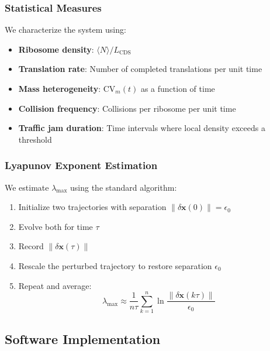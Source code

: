 \documentclass[11pt]{article}
\begin{document}
\subsubsection{Statistical Measures}

We characterize the system using:
\begin{itemize}[nosep]
    \item \textbf{Ribosome density}: $\langle N \rangle / L_{\text{CDS}}$
    \item \textbf{Translation rate}: Number of completed translations per unit time
    \item \textbf{Mass heterogeneity}: $\text{CV}_m(t)$ as a function of time
    \item \textbf{Collision frequency}: Collisions per ribosome per unit time
    \item \textbf{Traffic jam duration}: Time intervals where local density exceeds a threshold
\end{itemize}

\subsubsection{Lyapunov Exponent Estimation}

We estimate $\lambda_{\max}$ using the standard algorithm:
\begin{enumerate}[nosep]
    \item Initialize two trajectories with separation $\|\delta \mathbf{x}(0)\| = \epsilon_0$
    \item Evolve both for time $\tau$
    \item Record $\|\delta \mathbf{x}(\tau)\|$
    \item Rescale the perturbed trajectory to restore separation $\epsilon_0$
    \item Repeat and average:
    \begin{equation}
        \lambda_{\max} \approx \frac{1}{n\tau} \sum_{k=1}^{n} \ln \frac{\|\delta \mathbf{x}(k\tau)\|}{\epsilon_0}
    \end{equation}
\end{enumerate}

\subsection{Software Implementation}
\end{document}
